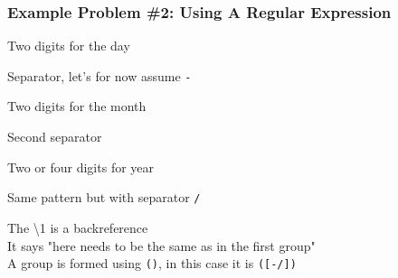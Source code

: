 \begin{frame}
  \frametitle{Example Problem \#2: Using A Regular Expression}
  \begin{center}\ttfamily
  \end{center}
  \vskip5mm
  \vskip2mm
  \begin{overprint}
    \begin{center}
      Two digits for the day
    \end{center}
    \begin{center}
      Separator, let's for now assume \texttt{-}
    \end{center}
    \begin{center}
      Two digits for the month
    \end{center}
    \begin{center}
      Second separator
    \end{center}
    \begin{center}
      Two or four digits for year
    \end{center}
    \begin{center}
      Same pattern but with separator \texttt{/}
    \end{center}
    \begin{center}
      The \textbackslash1 is a backreference \\
      It says "here needs to be the same as in the first group" \\
      A group is formed using \texttt{()}, in this case it is \texttt{([-/])}
    \end{center}
  \end{overprint}
\end{frame}

